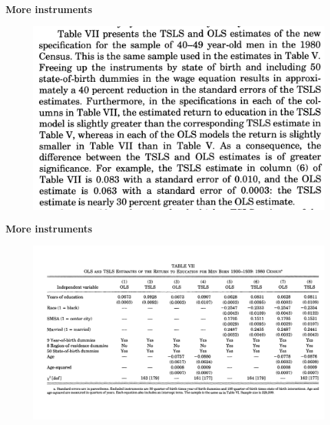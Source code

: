 \documentclass[notes=show]{beamer}
\begin{document}
\begin{frame}[plain]
\begin{center}
\textbf{More instruments}
\end{center}

	\begin{figure}
	\includegraphics[scale=.25]{./lecture_includes/weak_qob2.png}
	\end{figure}
	

\end{frame}


\begin{frame}[plain]
\begin{center}
\textbf{More instruments}
\end{center}

	\begin{figure}
	\includegraphics[scale=.18]{./lecture_includes/weak_qob3.png}
	\end{figure}
	

\end{frame}
\end{document}
